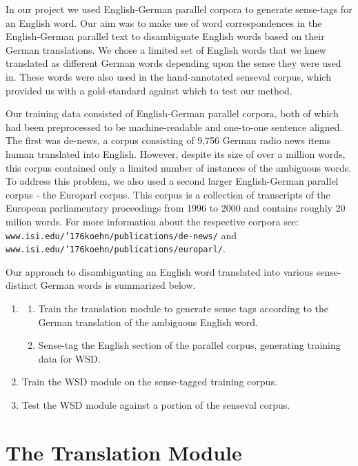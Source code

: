 \documentclass[a4wide,10pt]{article}
\begin{document}
In our project we used English-German parallel corpora to generate 
sense-tags for an English word. Our aim was to make 
use of word correspondences in the English-German parallel text 
to disambiguate English words based on their German translations. We chose 
a limited set of English words that we knew translated as different
German words depending upon the sense they were used in. These words
were also used in the hand-annotated senseval corpus, which provided us with
a gold-standard against which to test our method.      

Our training data consisted of English-German parallel corpora, both of 
which had been preprocessed to be machine-readable and one-to-one 
sentence aligned. The first was de-news, a corpus consisting of 9,756 German 
radio news items human translated into English. 
However, despite its size of over a million words, this corpus contained only 
a limited number of instances of the ambiguous words. To address this problem,
we also used a second larger English-German parallel corpus - the Europarl 
corpus\cite{europarl}. This corpus is a collection of transcripts of the 
European parliamentary proceedings from 1996 to 2000 and contains roughly 20
milion words. For more information about the respective corpora see: 
\texttt{www.isi.edu/{\char'176}koehn/publications/de-news/} and 
\texttt{www.isi.edu/{\char'176}koehn/publications/europarl/}. 

Our approach to disambiguating an English word translated into various 
sense-distinct German words is summarized below.    

\begin{enumerate}
\item 
\begin{enumerate}
\item Train the translation module to generate sense tags according
to the German translation of the ambiguous English word. 
\item Sense-tag the English section of the parallel corpus, generating training 
data for WSD. 
\end{enumerate}

\item Train the WSD module on the sense-tagged training corpus.
\item Test the WSD module against a portion of the senseval corpus.
\end{enumerate}

\section{The Translation Module}
\end{document}
